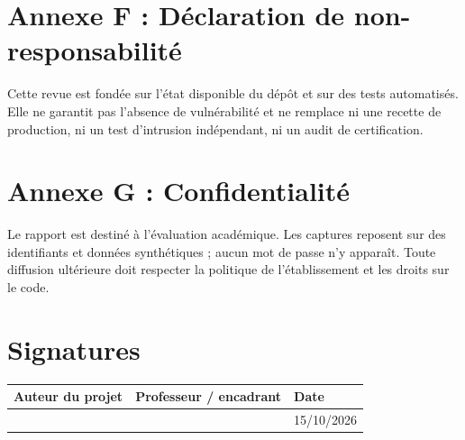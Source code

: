 \section*{Annexe F : D\'eclaration de non-responsabilit\'e}
Cette revue est fond\'ee sur l'\'etat disponible du d\'ep\^ot et sur des tests automatis\'es. Elle ne garantit pas l'absence de vuln\'erabilit\'e et ne remplace ni une recette de production, ni un test d'intrusion ind\'ependant, ni un audit de certification.

\section*{Annexe G : Confidentialit\'e}
Le rapport est destin\'e \`a l'\'evaluation acad\'emique. Les captures reposent sur des identifiants et donn\'ees synth\'etiques ; aucun mot de passe n'y appara\^it. Toute diffusion ult\'erieure doit respecter la politique de l'\'etablissement et les droits sur le code.

\section*{Signatures}
\begin{tabularx}{\textwidth}{X X X}
\toprule
Auteur du projet & Professeur / encadrant & Date\\
\midrule
\vspace{1.8cm} & & 15/10/2026\\
\bottomrule
\end{tabularx}
